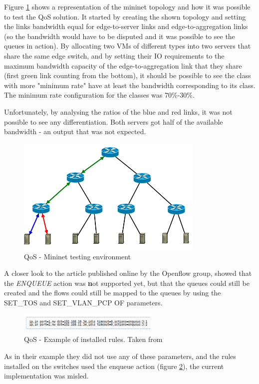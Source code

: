 \documentclass[12pt,english,oneside]{book}
\begin{document}
Figure \ref{fig:ofqos} shows a representation of the mininet topology and how it was possible to test the QoS solution.
It started by creating the shown topology and setting the links bandwidth equal for edge-to-server links and edge-to-aggregation links (so the bandwidth would have to be disputed and it was possible to see the queues in action).
By allocating two VMs of different types into two servers that share the same edge switch, and by setting their IO requirements to the maximum bandwidth capacity of the edge-to-aggregation link that they share (first green link counting from the bottom), it should be possible to see the class with more "minimum rate" have at least the bandwidth corresponding to its class.
The minimum rate configuration for the classes was 70\%-30\%.

Unfortunately, by analysing the ratios of the blue and red links, it was not possible to see any differentiation. Both servers got half of the available bandwidth - an output that was not expected.

\begin{figure}[h!tbp]
        \centering
        \includegraphics[width=0.8\textwidth]{figures/ofqos.png}
        \caption{QoS - Mininet testing environment}
        \label{fig:ofqos}
\end{figure}

A closer look to the article published online by the Openflow group\cite{qosof}, showed that the \textit{ENQUEUE} action was \textbf not supported yet, but that the queues could still be created and the flows could still be mapped to the queues by using the SET\_TOS and SET\_VLAN\_PCP OF parameters.
\begin{figure}[h!tbp]
        \centering
        \includegraphics[width=0.6\textwidth]{figures/ofqosexample.png}
        \caption{QoS - Example of installed rules. Taken from \cite{qosof}}
        \label{fig:ofqosexample}
\end{figure}
As in their example they did not use any of these parameters, and the rules installed on the switches used the enqueue action (figure \ref{fig:ofqosexample}), the current implementation was misled.
\end{document}
